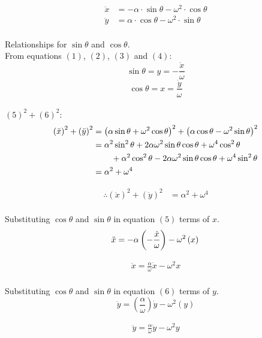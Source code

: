 \documentclass[12pt]{article}
\begin{document}
\begin{align}
\ddot{x} &= -\alpha \cdot \sin \theta - \omega^{2} \cdot \cos \theta \\
\ddot{y} &= \alpha \cdot \cos \theta - \omega^{2} \cdot \sin \theta
\end{align}
\\
Relationships for $\sin \theta$ and $\cos \theta$.\\[0.5cm]
From equations $(1)$, $(2)$, $(3)$ and $(4)$:
$$\sin \theta = y = -\dfrac{\dot{x}}{\omega} $$
$$\cos \theta = x =\dfrac{\dot{y}}{\omega} $$
\\
$(5)^2 + (6)^2 :$
\begin{align*}
\left(\ddot{x}\right)^{2}+\left(\ddot{y}\right)^{2} &= \left( \alpha \sin \theta + \omega^{2}\cos \theta \right)^{2} + \left( \alpha \cos \theta - \omega^{2}\sin \theta \right)^{2}\\
 													&= \alpha^{2}\sin^{2}\theta + 2\alpha \omega^{2}\sin \theta \cos \theta + \omega^{4} \cos^{2} \theta \\
 													&  \hspace{0.3 in} + \alpha^{2} \cos^{2} \theta - 2 \alpha \omega^{2} \sin \theta \cos \theta + \omega^{4}\sin^{2}\theta\\
 													&= \alpha^2 + \omega^4\\
\end{align*}

\begin{align}
\therefore \left(\ddot{x}\right)^{2}+\left(\ddot{y}\right)^{2} &= \alpha^2 + \omega^4
\end{align}
\\
Substituting $\cos\theta$ and $\sin\theta$ in equation $(5)$ terms of $x$.
$$\ddot{x} = -\alpha \left(- \frac{\dot{x}}{\omega} \right) - \omega^{2} \left( x \right)\\$$

\begin{align}
\ddot{x} = \frac{\alpha}{\omega}\dot{x} - \omega^{2} x
\end{align}
\\
Substituting $\cos\theta$ and $\sin\theta$ in equation $(6)$ terms of $y$.
$$\ddot{y} = \left(\frac{\alpha}{\omega}\right)\dot{y} - \omega^{2}(y)$$

\begin{align}
\ddot{y} = \frac{\alpha}{\omega}\dot{y}-\omega^{2}y
\end{align}
\end{document}
